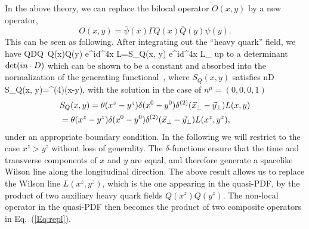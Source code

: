 In the above theory, we can replace the bilocal operator $O(x,y)$ by a new operator,
\begin{equation}\label{Eq:repl}
             O(x, y) = \overline{\psi}(x)\Gamma Q(x) \overline{Q}(y) \psi(y).
\end{equation}
This can be seen as following. After integrating out the ``heavy quark'' field, we have
\beq
{}\overline Q{\cal D}Q\, Q(x)\overline Q(y) e^{i\int d^4x {\cal L}}=S_Q(x, y) e^{i\int d^4x {\cal L_{}}}
\eeq
up to a determinant ${\rm det}(in\cdot D)$ which can be shown to be a constant and absorbed into the normalization of the generating functional~\cite{Mannel:1991mc}, where $S_Q(x, y)$ satisfies
\beq
n\cdot D\, S_Q(x, y)=\delta^{(4)}(x-y),
\eeq
with the solution in the case of $n^\mu=(0,0,0,1)$
\begin{align}
&S_Q(x,y)=\theta(x^z-y^z)\delta(x^0-y^0)\delta^{(2)}(\vec x_\perp-\vec y_\perp)L(x,y)\nonumber\\
&=\theta(x^z-y^z)\delta(x^0-y^0)\delta^{(2)}(\vec x_\perp-\vec y_\perp)L(x^z,y^z),
\end{align}
under an appropriate boundary condition. In the following we will restrict to the case $x^z>y^z$ without loss of generality. The $\delta$-functions ensure that the time and transverse components of $x$ and $y$ are equal, and therefore generate a spacelike Wilson line along the longitudinal direction. The above result allows us to replace the Wilson line $L(x^z,y^z)$, which is the one appearing in the quasi-PDF, by the product of two auxiliary heavy quark fields $Q(x^z)\overline Q(y^z)$. The non-local operator in the quasi-PDF then becomes the product of two composite operators in Eq.~(\ref{Eq:repl}).
